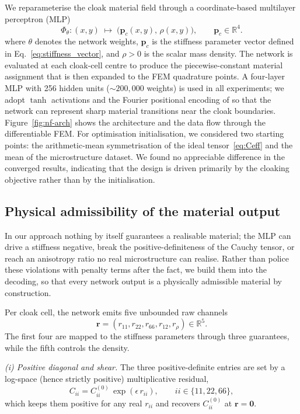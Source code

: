 \documentclass[preprint,12pt]{elsarticle}
\newcommand{\mbf}[1]{\mathbf{#1}}
\newcommand{\be}{\begin{equation}}
\newcommand{\ee}{\end{equation}}
\begin{document}
We reparameterise the cloak material field through a coordinate-based
multilayer perceptron (MLP)
\be\label{eq:neural_field}
  \Phi_\theta\colon(x,y)
  \;\mapsto\;
  \bigl(\mbf{p}_c(x,y),\,\rho(x,y)\bigr),
  \qquad
  \mbf{p}_c\in\mathbb{R}^{4}.
\ee
where $\theta$ denotes the network weights, $\mbf{p}_c$ is the
stiffness parameter vector defined in Eq.~\eqref{eq:stiffness_vector},
and $\rho>0$ is the scalar mass density. The network
is evaluated at each cloak-cell centre to produce the piecewise-constant
material assignment that is then expanded to the FEM quadrature points.
A four-layer MLP with 256 hidden units ($\sim\!200{,}000$ weights) is
used in all experiments; we adopt $\tanh$ activations and the Fourier
positional encoding of \citet{tancik2020fourier} so that the network
can represent sharp material transitions near the cloak boundaries.
Figure~\ref{fig:nf-arch} shows the architecture and the data flow
through the differentiable FEM. For optimisation initialisation, we considered two starting points: the arithmetic-mean symmetrisation of the ideal tensor~\eqref{eq:Ceff} and the mean of the microstructure dataset. We found no appreciable
difference in the converged results, indicating that the design is
driven primarily by the cloaking objective rather than by the
initialisation.

\subsection{Physical admissibility of the material output}\label{sec:constrained}

In our approach nothing by itself guarantees 
a realisable material; the MLP can drive
a stiffness negative, break the positive-definiteness of the Cauchy
tensor, or reach an anisotropy ratio no real microstructure can realise.
Rather than police these violations with penalty terms after the fact, we
build them into the decoding, so that every network output is a
physically admissible material by construction.

Per cloak cell, the network emits five unbounded raw channels
\[
\mbf{r}
=
(r_{11},r_{22},r_{66},r_{12},r_{\rho})
\in\mathbb{R}^{5}.
\]
The first four are mapped to the stiffness parameters through three
guarantees, while the fifth controls the density.

\emph{(i) Positive diagonal and shear.} The three positive-definite
entries are set by a log-space (hence strictly positive) multiplicative
residual,
\be\label{eq:constr_diag}
  C_{ii} = C_{ii}^{(0)}\,\exp(\epsilon\,r_{ii}),
  \qquad ii\in\{11,22,66\},
\ee
which keeps them positive for any real $r_{ii}$ and recovers
$C_{ii}^{(0)}$ at $\mbf{r}=\mbf 0$.
\end{document}
